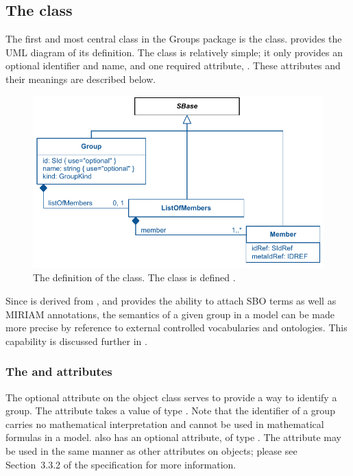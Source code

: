 \subsection{The  class}
\label{group-class}
\label{listofmembers-class}

The first and most central class in the Groups package is the \Group class.   provides the UML diagram of its definition.  The \Group class is relatively simple; it only provides an optional identifier and name, and one required attribute, .  These attributes and their meanings are described below.

\begin{figure}[bh]
  \includegraphics{figs/group-uml}
  \caption{The definition of the \Group class.  The \Member class is defined .}
  \label{group-uml}
  \label{member-uml}
\end{figure}

Since \Group is derived from \SBase, and \SBase provides the ability to attach SBO terms as well as MIRIAM annotations, the semantics of a given group in a model can be made more precise by reference to external controlled vocabularies and ontologies.  This capability is discussed further in .


\subsubsection{The \fixttspace{} and \fixttspace{} attributes}

The optional  attribute on the \Group object class serves to provide a way to identify a group.  The attribute takes a value of type .  Note that the identifier of a group carries no mathematical interpretation and cannot be used in mathematical formulas in a model.  \Group also has an optional  attribute, of type .  The  attribute may be used in the same manner as other  attributes on \sbmlthreecore objects; please see Section~3.3.2 of the \sbmlthreecore specification for more information.


